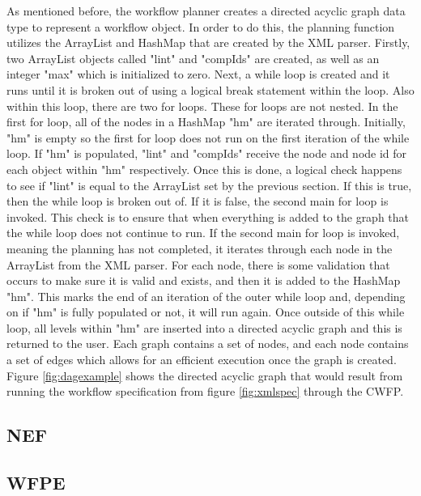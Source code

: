 \documentclass[fleqn,10pt]{SelfArx} %
\begin{document}
As mentioned before, the workflow planner creates a directed acyclic graph data type to represent a workflow object. In order to do this, the planning function utilizes the ArrayList and HashMap that are created by the XML parser. Firstly, two ArrayList objects called "lint" and "compIds" are created, as well as an integer "max" which is initialized to zero. Next, a while loop is created and it runs until it is broken out of using a logical break statement within the loop. Also within this loop, there are two for loops. These for loops are not nested. In the first for loop, all of the nodes in a HashMap "hm" are iterated through. Initially, "hm" is empty so the first for loop does not run on the first iteration of the while loop. If "hm" is populated, "lint" and "compIds" receive the node and node id for each object within "hm" respectively. Once this is done, a logical check happens to see if "lint" is equal to the ArrayList set by the previous section. If this is true, then the while loop is broken out of. If it is false, the second main for loop is invoked. This check is to ensure that when everything is added to the graph that the while loop does not continue to run. If the second main for loop is invoked, meaning the planning has not completed, it iterates through each node in the ArrayList from the XML parser. For each node, there is some validation that occurs to make sure it is valid and exists, and then it is added to the HashMap "hm". This marks the end of an iteration of the outer while loop and, depending on if "hm" is fully populated or not, it will run again. Once outside of this while loop, all levels within "hm" are inserted into a directed acyclic graph and this is returned to the user. Each graph contains a set of nodes, and each node contains a set of edges which allows for an efficient execution once the graph is created. Figure \ref{fig:dagexample} shows the directed acyclic graph that would result from running the workflow specification from figure \ref{fig:xmlspec} through the CWFP.

\subsection{NEF}



\subsection{WFPE}
\end{document}
